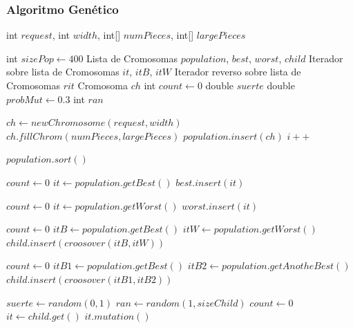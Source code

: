 \documentclass[letterpaper,11pt]{article}
\begin{document}
\subsubsection{Algoritmo Gen\'etico}

\begin{center}
\begin{algorithmic}

\REQUIRE int $request$, int $width$, int[] $numPieces$, int[] $largePieces$

\STATE int $sizePop \gets 400$
\STATE Lista de Cromosomas $population$, $best$, $worst$, $child$
\STATE Iterador sobre lista de Cromosomas $it$, $itB$, $itW$
\STATE Iterador reverso sobre lista de Cromosomas $rit$
\STATE Cromosoma $ch$
\STATE int $count \gets 0$
\STATE double $suerte$
\STATE double $probMut \gets 0.3$
\STATE int $ran$
\\

	\STATE $ch \gets new Chromosome(request,width)$
    \STATE $ch.fillChrom(numPieces,largePieces)$
    \STATE $population.insert(ch)$
    \STATE $i++$
\ENDWHILE


    \STATE $population.sort()$
  
    \STATE $count \gets 0$
    	\STATE $it \gets population.getBest()$
    	\STATE $best.insert(it)$
    \ENDWHILE

    \STATE $count \gets 0$
    	\STATE $it \gets population.getWorst()$
    	\STATE $worst.insert(it)$
    \ENDWHILE

    \STATE $count \gets 0$
    	\STATE $itB \gets population.getBest()$
		\STATE $itW \gets population.getWorst()$
    	\STATE $child.insert(croosover(itB,itW))$
    \ENDWHILE

    \STATE $count \gets 0$
    	\STATE $itB1 \gets population.getBest()$
		\STATE $itB2 \gets population.getAnotheBest()$
    	\STATE $child.insert(croosover(itB1,itB2))$
    \ENDWHILE

    \STATE $suerte \gets random(0,1)$
    	\STATE $ran \gets random(1,sizeChild)$
      	\STATE $count \gets 0$
			\STATE $it \gets child.get()$
			\STATE $it.mutation()$	
		\ENDWHILE
	\ENDIF


\end{algorithmic}
\end{center}
\end{document}
